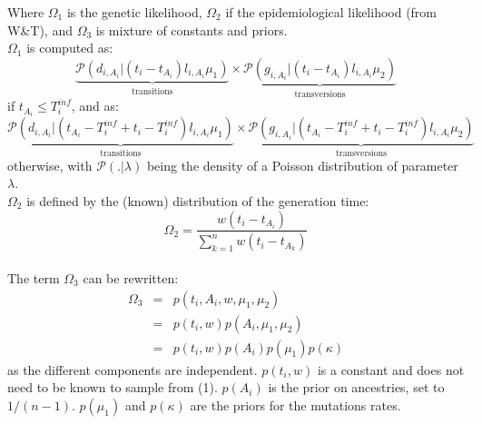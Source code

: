 \documentclass[10pt]{article}
\begin{document}
\noindent Where $\Omega_1$ is the genetic likelihood, $\Omega_2$ if the epidemiological likelihood (from W\&T), and $\Omega_3$ is mixture of constants and priors.
\\




$\Omega_1$ is computed as: 
$$
\underbrace{\mathcal{P}\left(d_{i,A_i} | (t_i - t_{A_i}) l_{i,A_i} \mu_1 \right)}_{\mbox{transitions}}
\times 
\underbrace{\mathcal{P}\left(g_{i,A_i} | (t_i - t_{A_i}) l_{i,A_i} \mu_2 \right)}_{\mbox{transversions}}
$$
if $t_{A_i} \leq T_i^{inf} $, and as:
$$
\underbrace{\mathcal{P}\left(d_{i,A_i} | (t_{A_i} - T_i^{inf} + t_i - T_i^{inf}) l_{i,A_i} \mu_1 \right)}_{\mbox{transitions}}
\times 
\underbrace{\mathcal{P}\left(g_{i,A_i} | (t_{A_i} - T_i^{inf} + t_i - T_i^{inf}) l_{i,A_i} \mu_2 \right)}_{\mbox{transversions}}
$$
otherwise, with $\mathcal{P}(. | \lambda)$ being the density of a Poisson distribution of parameter $\lambda$.
~\\





$\Omega_2$ is defined by the (known) distribution of the generation time:
$$
\Omega_2 = \frac{w(t_i - t_{A_i})}{\sum_{k=1}^n w(t_i - t_{A_k})} 
$$
~\\



The term $\Omega_3$ can be rewritten:
\begin{eqnarray}
\Omega_3 &=&  p(t_i, A_i, w, \mu_1, \mu_2) \\
	 &=&  p(t_i, w) p(A_i, \mu_1, \mu_2) \\
	 &=&  p(t_i, w) p(A_i) p(\mu_1) p(\kappa) 
\end{eqnarray}
as the different components are independent.
$p(t_i, w)$ is a constant and does not need to be known to sample from (1).
$p(A_i)$ is the prior on ancestries, set to $1/(n-1)$.
$ p(\mu_1)$ and $p(\kappa)$ are the priors for the mutations rates.
\end{document}

